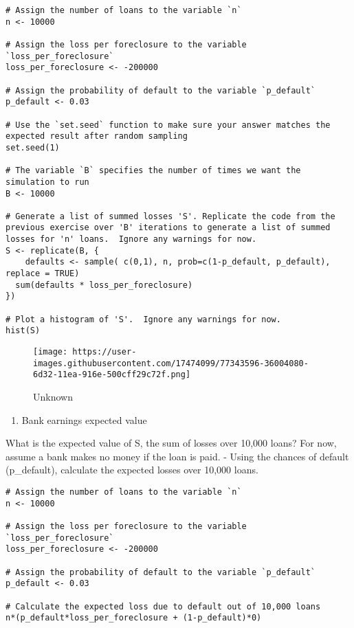 \documentclass[
]{article}
\providecommand{\tightlist}{%
  \setlength{\itemsep}{0pt}\setlength{\parskip}{0pt}}
\begin{document}
\begin{verbatim}
# Assign the number of loans to the variable `n`
n <- 10000

# Assign the loss per foreclosure to the variable `loss_per_foreclosure`
loss_per_foreclosure <- -200000

# Assign the probability of default to the variable `p_default`
p_default <- 0.03

# Use the `set.seed` function to make sure your answer matches the expected result after random sampling
set.seed(1)

# The variable `B` specifies the number of times we want the simulation to run
B <- 10000

# Generate a list of summed losses 'S'. Replicate the code from the previous exercise over 'B' iterations to generate a list of summed losses for 'n' loans.  Ignore any warnings for now.
S <- replicate(B, {
    defaults <- sample( c(0,1), n, prob=c(1-p_default, p_default), replace = TRUE) 
  sum(defaults * loss_per_foreclosure)
})

# Plot a histogram of 'S'.  Ignore any warnings for now.
hist(S)
\end{verbatim}

\begin{figure}
\centering
\texttt{[image: https://user-images.githubusercontent.com/17474099/77343596-36004080-6d32-11ea-916e-500cff29c72f.png]}
\caption{Unknown}
\end{figure}

\begin{enumerate}
\def\labelenumi{\arabic{enumi}.}
\setcounter{enumi}{2}
\tightlist
\item
  Bank earnings expected value
\end{enumerate}

What is the expected value of S, the sum of losses over 10,000 loans?
For now, assume a bank makes no money if the loan is paid. - Using the
chances of default (p\_default), calculate the expected losses over
10,000 loans.

\begin{verbatim}
# Assign the number of loans to the variable `n`
n <- 10000

# Assign the loss per foreclosure to the variable `loss_per_foreclosure`
loss_per_foreclosure <- -200000

# Assign the probability of default to the variable `p_default`
p_default <- 0.03

# Calculate the expected loss due to default out of 10,000 loans
n*(p_default*loss_per_foreclosure + (1-p_default)*0)
\end{verbatim}
\end{document}
